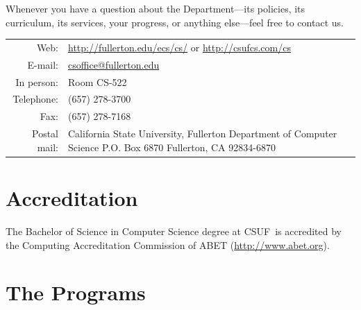 \documentclass{book}
\newcommand{\CampusName}{CSUF}
\newcommand{\shrunkurl}[1]{\url{http://csufcs.com/#1}}
\begin{document}
Whenever you have a question about the Department---its policies, its
curriculum, its services, your progress, or anything else---feel free
to contact us.

\begin{tabular}{r p{6in}} %
  Web: & \url{http://fullerton.edu/ecs/cs/} or \shrunkurl{cs} \\ \index{website}
  E-mail: & \href{mailto:csoffice@fullerton.edu}{\url{csoffice@fullerton.edu}} \\ \index{e-mail}
  In person: & Room CS-522 \\ \index{department office}
  Telephone: & (657) 278-3700 \\ \index{phone number} \index{telephone number}
  Fax: & (657) 278-7168 \\ \index{fax number}
  Postal mail: & California State University, Fullerton \newline\index{postal address}\index{address}Department of Computer Science \newline
P.O. Box 6870 \newline
Fullerton, CA 92834-6870
\end{tabular}

\section{Accreditation} 

The Bachelor of Science in Computer Science degree at \CampusName~is
accredited by the Computing Accreditation Commission of ABET
(\url{http://www.abet.org}).

\begin{center}
\end{center}

\section{The Programs}
\end{document}
